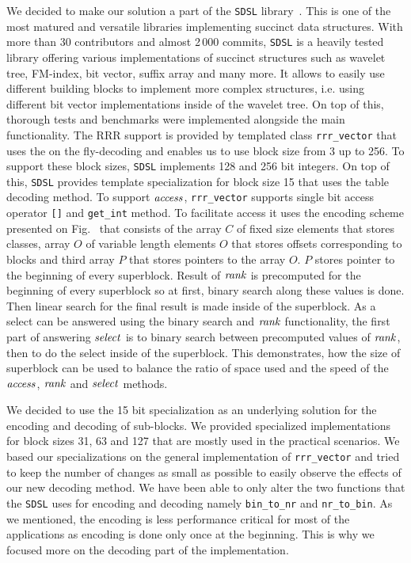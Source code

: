 We decided to make our solution a part of the \texttt{SDSL} library~\citep{gog2014theory}. This
is one of the most matured and versatile libraries implementing succinct data structures.
With more than 30 contributors and almost 2\,000 commits, \texttt{SDSL} is a heavily tested library
offering various implementations of succinct structures such as wavelet tree, FM-index,
bit vector, suffix array and many more. It allows to easily use different building blocks
to implement more complex structures, i.e. using different bit vector implementations inside
of the wavelet tree. On top of this, thorough tests and benchmarks were implemented alongside
the main functionality. The RRR support is provided by templated class \texttt{rrr\_vector}
that uses the on the fly-decoding and enables us to use block size from 3 up to 256. To support
these block sizes, \texttt{SDSL} implements 128 and 256 bit integers. On top of this, \texttt{SDSL}
provides template specialization for block size 15 that uses the table decoding method. To support $\mathit{access}$,
\texttt{rrr\_vector} supports single bit access operator \texttt{[]} and \texttt{get\_int} method.
To facilitate access it uses the encoding scheme presented on Fig.~\label{obr:RRRFinal} that
consists of the array $C$ of fixed size elements that stores classes, array $O$ of variable length
elements $O$ that stores offsets corresponding to blocks and third array $P$ that stores pointers
to the array $O$. $P$ stores pointer to the beginning of every superblock. Result of $\mathit{rank}$ is
precomputed for the beginning of every superblock so at first, binary search along these values
is done. Then linear search for the final result is made inside of the superblock. As a select
can be answered using the binary search and $\mathit{rank}$ functionality, the first part of answering $\mathit{select}$ is to
binary search between precomputed values of $\mathit{rank}$, then to do the select inside of the superblock.
This demonstrates, how the size of superblock can be used to balance the ratio of space used and the
speed of the $\mathit{access}$, $\mathit{rank}$ and $\mathit{select}$ methods.

We decided to use the 15 bit specialization as an underlying solution for the encoding and decoding of
sub-blocks. We provided specialized implementations for block sizes 31, 63 and 127 that are mostly used
in the practical scenarios. We based our specializations on the general implementation of
\texttt{rrr\_vector} and tried to keep the number of changes as small as possible to easily observe the
effects of our new decoding method. We have been able to only alter the two functions that the \texttt{SDSL}
uses for encoding and decoding namely \texttt{bin\_to\_nr} and \texttt{nr\_to\_bin}. As we mentioned,
the encoding is less performance critical for most of the applications as encoding is done only once
at the beginning. This is why we focused more on the decoding part of the implementation.

